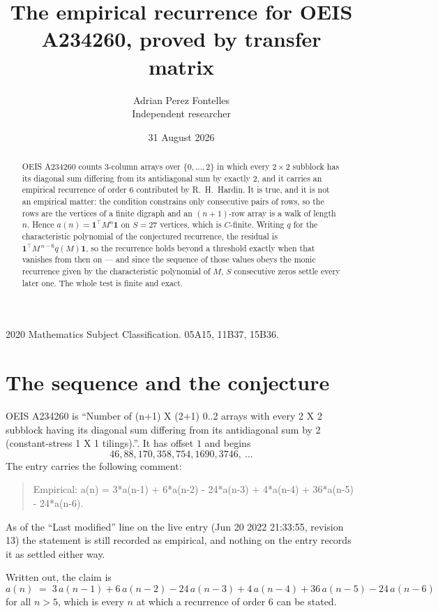 \documentclass[11pt,a4paper]{article}
\title{The empirical recurrence for OEIS A234260, proved by transfer matrix}
\author{Adrian Perez Fontelles\\ \small Independent researcher}
\date{31 August 2026}
\theoremstyle{plain}
\theoremstyle{definition}
\begin{document}
\maketitle

\begin{abstract}
OEIS A234260 counts $3$-column arrays over $\{0,\dots,2\}$ in which every
$2\times2$ subblock has its diagonal sum differing from its antidiagonal sum by
exactly $2$, and it
carries an empirical recurrence of order $6$ contributed by R.~H.~Hardin. It is true,
and it is not an empirical matter: the condition constrains only consecutive pairs of rows,
so the rows are the vertices of a finite digraph and an $(n+1)$-row array is a walk of
length $n$. Hence $a(n)=\mathbf{1}^{\!\top}M^{n}\mathbf{1}$ on $S=27$ vertices, which
is $C$-finite. Writing $q$ for the characteristic polynomial of the conjectured recurrence,
the residual is $\mathbf{1}^{\!\top}M^{\,n-6}q(M)\mathbf{1}$, so the recurrence
holds beyond a threshold exactly when that vanishes from then on --- and since the sequence
of those values obeys the monic recurrence given by the characteristic polynomial of $M$,
$S$ consecutive zeros settle every later one. The whole test is finite and exact.
\end{abstract}

\noindent\small 2020 Mathematics Subject Classification. 05A15, 11B37, 15B36.\normalsize

\section{The sequence and the conjecture}

OEIS A234260 is ``Number of (n+1) X (2+1) 0..2 arrays with every 2 X 2 subblock having its diagonal sum differing from its antidiagonal sum by 2 (constant-stress 1 X 1 tilings).''. It has offset
$1$ and begins
\[
46, 88, 170, 358, 754, 1690, 3746,\ \dots
\]
The entry carries the following comment:
\begin{quote}\small
Empirical: a(n) = 3*a(n-1) + 6*a(n-2) - 24*a(n-3) + 4*a(n-4) + 36*a(n-5) - 24*a(n-6).
\end{quote}
As of the ``Last modified'' line on the live entry (Jun 20 2022 21:33:55, revision 13) the statement is
still recorded as empirical, and nothing on the entry records it as settled either way.

Written out, the claim is
\begin{equation}\label{eq:conj}
a(n)\;=\;3\,a(n-1) + 6\,a(n-2) - 24\,a(n-3) + 4\,a(n-4) + 36\,a(n-5) - 24\,a(n-6)
\end{equation}
for all $n>5$, which is every $n$ at which a recurrence of order $6$ can be
stated.
\end{document}
